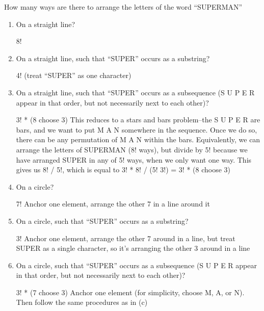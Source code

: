 \question How many ways are there to arrange the letters of the word 
“SUPERMAN”
\begin{enumerate}[label=(\alph*)]
 \item On a straight line?
\begin{solution} 8! \end{solution}

\item On a straight line, such that “SUPER” occurs as a substring?
\begin{solution} 4! (treat “SUPER” as one character) \end{solution}

\item On a straight line, such that “SUPER” occurs as a subsequence 
(S U P E R appear in that order, but not necessarily next to each other)? 
\begin{solution} 3! * (8 choose 3)
This reduces to a stars and bars problem--the S U P E R are bars, and 
we want to put M A N somewhere in the sequence. Once we do so, there 
can be any permutation of M A N within the bars.
Equivalently, we can arrange the letters of SUPERMAN (8! ways), but 
divide by 5! because we have arranged SUPER in any of 5! ways, when 
we only want one way. This gives us 8! / 5!, which is equal to 
3! * 8! / (5! 3!) = 3! * (8 choose 3)
 \end{solution}


\item On a circle? 
\begin{solution} 7!
    Anchor one element, arrange the other 7 in a line around it
 \end{solution}


\item On a circle, such that “SUPER” occurs as a substring?
\begin{solution} 3!
Anchor one element, arrange the other 7 around in a line, but treat 
SUPER as a single character, so it’s arranging the other 3 around in 
a line  \end{solution}

\item On a circle, such that “SUPER” occurs as a subsequence (S U P E R 
appear in that order, but not necessarily next to each other)?
\begin{solution} 3! * (7 choose 3)
Anchor one element (for simplicity, choose M, A, or N). Then follow the same procedures as in (c) \end{solution}

\end{enumerate}